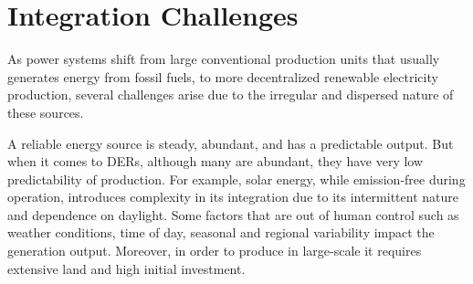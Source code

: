 
\section{Integration Challenges}

As power systems shift from large conventional production units that usually generates energy from fossil fuels, to more decentralized renewable electricity production, several challenges arise due to the irregular and dispersed nature of these sources.

A reliable energy source is steady, abundant, and has a predictable output. But when it comes to \acp{DER}, although many are abundant, they have very low predictability of production. For example, solar energy, while emission-free during operation, introduces complexity in its integration due to its intermittent nature and dependence on daylight. Some factors that are out of human control such as weather conditions, time of day, seasonal and regional variability impact the generation output. Moreover, in order to produce in large-scale it requires extensive land and high initial investment.





